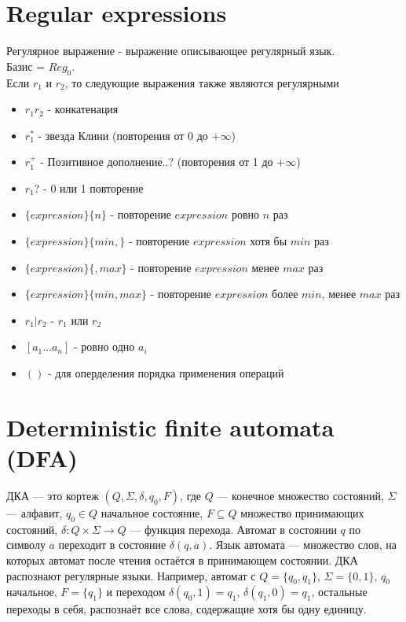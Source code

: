 \documentclass{article}
\begin{document}
	\section{Regular expressions}
	Регулярное выражение - выражение описывающее регулярный язык.\\ 
	Базис = $Reg_0$.\\
	Если $r_1$ и $r_2$, то следующие выражения также являются регулярными\\
	\begin{itemize}
		\item $r_1r_2$ - конкатенация
		\item $r^{*}_1$ - звезда Клини (повторения от 0 до $+\infty$)
		\item $r^{+}_1$ - Позитивное дополнение..? (повторения от 1 до $+\infty$)
		\item $r_1?$ - 0 или 1 повторение
		\item $\{expression\}\{n\}$ - повторение $expression$ ровно $n$ раз
		\item $\{expression\}\{min,\}$ - повторение $expression$ хотя бы $min$ раз
		\item $\{expression\}\{, max\}$ - повторение $expression$ менее $max$ раз
		\item $\{expression\}\{min, max\}$ - повторение $expression$ более $min$, менее $max$ раз
		\item $r_1 | r_2$ - $r_1$ или $r_2$
		\item $[a_1 ... a_n]$ - ровно одно $a_i$
		\item $()$ - для оперделения порядка применения операций
	\end{itemize}
	
	\section{Deterministic finite automata (DFA)}
	ДКА --- это кортеж $(Q, \Sigma, \delta, q_0, F)$, где $Q$ --- конечное множество состояний, $\Sigma$ --- алфавит, $q_0\in Q$ начальное состояние, $F\subseteq Q$ множество принимающих состояний, $\delta\colon Q\times\Sigma\to Q$ --- функция перехода. Автомат в состоянии $q$ по символу $a$ переходит в состояние $\delta(q,a)$. Язык автомата --- множество слов, на которых автомат после чтения остаётся в принимающем состоянии. ДКА распознают регулярные языки. Например, автомат с $Q=\{q_0,q_1\}$, $\Sigma=\{0,1\}$, $q_0$ начальное, $F=\{q_1\}$ и переходом $\delta(q_0,1)=q_1$, $\delta(q_1,0)=q_1$, остальные переходы в себя, распознаёт все слова, содержащие хотя бы одну единицу.
	
\end{document}
